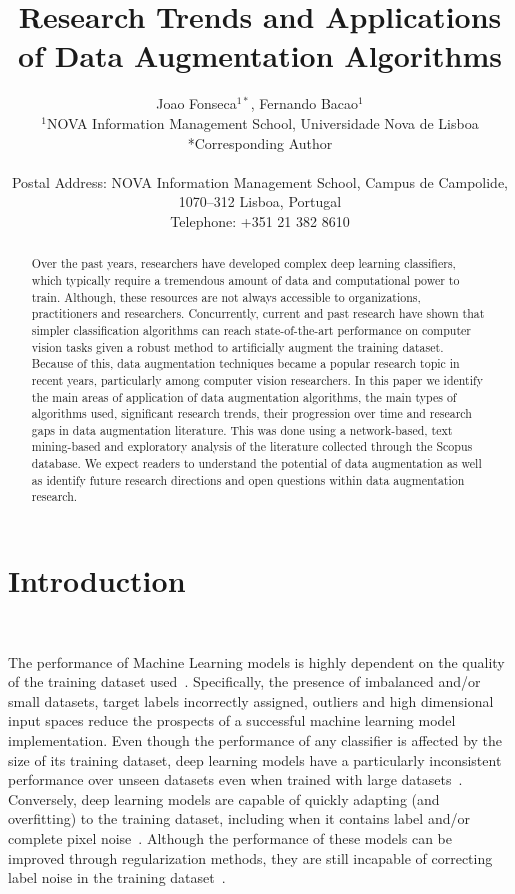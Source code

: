 \documentclass[parskip=full]{scrartcl}
\date{}
\title{%
    Research Trends and Applications of Data Augmentation Algorithms
}
\author{%
	Joao Fonseca\(^{1*}\), Fernando Bacao\(^{1}\)
	\\
	\small{\(^{1}\)NOVA Information Management School, Universidade Nova de Lisboa}
	\\
	\small{*Corresponding Author}
	\\
	\\
	\small{Postal Address: NOVA Information Management School, Campus de
    Campolide, 1070--312 Lisboa, Portugal}
	\\
	\small{Telephone: +351 21 382 8610}
}
\begin{document}
\maketitle

\begin{abstract}
    Over the past years, researchers have developed complex deep learning
    classifiers, which typically require a tremendous amount of data and
    computational power to train. Although, these resources are not always
    accessible to organizations, practitioners and researchers. Concurrently,
    current and past research have shown that simpler classification
    algorithms can reach state-of-the-art performance on computer vision tasks
    given a robust method to artificially augment the training dataset.
    Because of this, data augmentation techniques became a popular research
    topic in recent years, particularly among computer vision researchers. In
    this paper we identify the main areas of application of data augmentation
    algorithms, the main types of algorithms used, significant research
    trends, their progression over time and research gaps in data augmentation
    literature. This was done using a network-based, text mining-based and
    exploratory analysis of the literature collected through the Scopus
    database. We expect readers to understand the potential of data
    augmentation as well as identify future research directions and open
    questions within data augmentation research.
\end{abstract}

\section{Introduction}~\label{sec:introduction}

The performance of Machine Learning models is highly dependent on the quality
of the training dataset used~\cite{Fenza2021}. Specifically, the presence of
imbalanced and/or small datasets, target labels incorrectly assigned, outliers
and high dimensional input spaces reduce the prospects of a successful machine
learning model implementation. Even though the performance of any classifier
is affected by the size of its training dataset, deep learning models have a
particularly inconsistent performance over unseen datasets even when trained
with large datasets~\cite{Hu2020}. Conversely, deep learning models are
capable of quickly adapting (and overfitting) to the training dataset,
including when it contains label and/or complete pixel noise~\cite{Zhang2021}.
Although the performance of these models can be improved through
regularization methods, they are still incapable of correcting label noise in
the training dataset~\cite{Zhang2021}.
\end{document}
